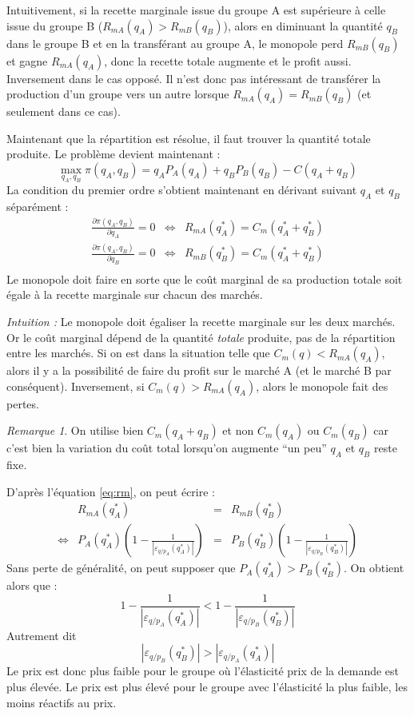 \documentclass[
]{book}
\theoremstyle{definition}
\theoremstyle{definition}
\theoremstyle{definition}
\theoremstyle{definition}
\theoremstyle{remark}
\newtheorem*{remark}{Remarque}
\begin{document}
Intuitivement, si la recette marginale issue du groupe A est supérieure à celle issue du groupe B (\(R_{mA}(q_A) > R_{mB}(q_B)\)), alors en diminuant la quantité \(q_B\) dans le groupe B et en la transférant au groupe A, le monopole perd \(R_{mB}(q_B)\) et gagne \(R_{mA}(q_A)\), donc la recette totale augmente et le profit aussi.
Inversement dans le cas opposé.
Il n'est donc pas intéressant de transférer la production d'un groupe vers un autre lorsque \(R_{mA}(q_A) = R_{mB}(q_B)\) (et seulement dans ce cas).

Maintenant que la répartition est résolue, il faut trouver la quantité totale produite.
Le problème devient maintenant :
\[
\max_{q_A, q_B} \pi(q_A, q_B) = q_AP_A(q_A) + q_BP_B(q_B) -C(q_A+q_B)
\]
La condition du premier ordre s'obtient maintenant en dérivant suivant \(q_A\) et \(q_B\) séparément :
\[
\begin{array}{rcl}
\frac{\partial\pi(q_A, q_B)}{\partial q_A} = 0&\Leftrightarrow& R_{mA}(q_A^*) = C_m(q_A^*+q_B^*)\\
\frac{\partial\pi(q_A, q_B)}{\partial q_B} = 0&\Leftrightarrow& R_{mB}(q_B^*) = C_m(q_A^*+q_B^*)\\
\end{array}
\]
Le monopole doit faire en sorte que le coût marginal de sa production totale soit égale à la recette marginale sur chacun des marchés.

\emph{Intuition :}
Le monopole doit égaliser la recette marginale sur les deux marchés.
Or le coût marginal dépend de la quantité \emph{totale} produite, pas de la répartition entre les marchés.
Si on est dans la situation telle que \(C_m(q)<R_{mA}(q_A)\), alors il y a la possibilité de faire du profit sur le marché A (et le marché B par conséquent).
Inversement, si \(C_m(q)>R_{mA}(q_A)\), alors le monopole fait des pertes.

\begin{remark}
On utilise bien \(C_m(q_A+q_B)\) et non \(C_m(q_A)\) ou \(C_m(q_B)\) car c'est bien la variation du coût total lorsqu'on augmente ``un peu'' \(q_A\) et \(q_B\) reste fixe.
\end{remark}

D'après l'équation \eqref{eq:rm}, on peut écrire :
\[
\begin{array}{crcl}
&R_{mA}(q_A^*) &=& R_{mB}(q_B^*)\\
\Leftrightarrow & P_A(q_A^*)\left(1-\frac{1}{\left|\varepsilon_{q/p_A}(q^*_A)\right|}\right) & = & P_B(q_B^*)\left(1-\frac{1}{\left|\varepsilon_{q/p_B}(q_B^*)\right|}\right)
\end{array}
\]
Sans perte de généralité, on peut supposer que \(P_A(q_A^*)> P_B(q_B^*)\).
On obtient alors que :
\[
1-\frac{1}{\left|\varepsilon_{q/p_A}(q_A^*)\right|} <1-\frac{1}{\left|\varepsilon_{q/p_B}(q_B^*)\right|}
\]
Autrement dit
\[
\left|\varepsilon_{q/p_B}(q_B^*)\right|>\left|\varepsilon_{q/p_A}(q^*_A)\right|
\]
Le prix est donc plus faible pour le groupe où l'élasticité prix de la demande est plus élevée.
Le prix est plus élevé pour le groupe avec l'élasticité la plus faible, les moins réactifs au prix.
\end{document}
